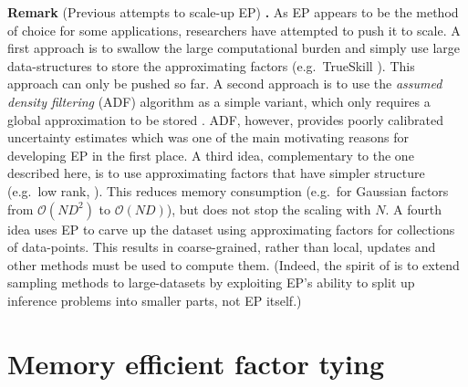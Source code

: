 \vspace{1em}
\begin{tcolorbox}
\textbf{Remark} (Previous attempts to scale-up EP) \textbf{.}
As EP appears to be the method of choice for some applications, researchers have attempted to push it to scale. A first approach is to swallow the large computational burden and simply use large data-structures to store the approximating factors (e.g.~TrueSkill \citep{herbrich:trueskill2006}). This approach can only be pushed so far. A second approach is to use the \emph{assumed density filtering} (ADF) algorithm as a simple variant, which only requires a global approximation to be stored \citep{maybeck:adf1982}. ADF, however, provides poorly calibrated uncertainty estimates \citep{minka:ep2001} which was one of the main motivating reasons for developing EP in the first place. 
A third idea, complementary to the one described here, is to use approximating factors that have simpler structure (e.g.~low rank, \citep{qi+minka:sparseGP2010}). This reduces memory consumption (e.g.~for Gaussian factors from $\mathcal{O}(ND^2)$ to $\mathcal{O}(ND)$), but does not stop the scaling with $N$. A fourth idea uses EP to carve up the dataset \citep{gelman:dep2014,xu:sms2014} using approximating factors for collections of data-points. This results in coarse-grained, rather than local, updates and other methods must be used to compute them. (Indeed, the spirit of \cite{gelman:dep2014,xu:sms2014} is to extend sampling methods to large-datasets by exploiting EP's ability to split up inference problems into smaller parts, not EP itself.) 
\end{tcolorbox}

\section{Memory efficient factor tying}

